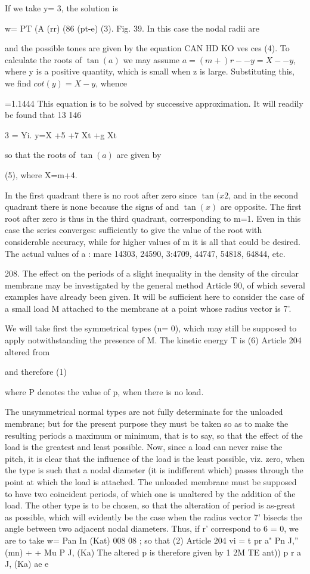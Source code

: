 If we take y= 3, the solution is

w= PT (A (rr) (86 (pt-e) (3). Fig. 39. In this case the nodal
radii are

and the possible tones are given by the equation CAN HD KO ves ces (4).
To calculate the roots of
\( \tan(a)\) we may assume \(a=(m+)r--y=X--y\), where y
is a positive quantity, which is small when z is large. Substituting
this, we find \( cot(y)= X-y\), whence

=1.1444 This equation is to be solved by successive approximation. It
will readily be found that 13 146

3 = Yi. y=X +5 +7 Xt +g Xt


so that the roots of \(\tan(a)\) are given by

(5), where X=m+4.

In the first quadrant there is no root after zero since \(\tan(x 2\), and in
the second quadrant there is none because the signs of and \(\tan(x)\) are
opposite. The first root after zero is thus in the third quadrant,
corresponding to m=1. Even in this case the series converges:
sufficiently to give the value of the root with considerable accuracy,
while for higher values of m it is all that could be desired. The actual
values of a : mare 14303, 24590, 3:4709, 44747, 54818, 64844, etc.

208. The effect on the periods of a slight inequality in the density of
the circular membrane may be investigated by the general method
Article 90, of which several examples have already been given. It will
be sufficient here to consider the case of a small load M attached to
the membrane at a point whose radius vector is 7'.

We will take first the symmetrical types (n= 0), which may still be
supposed to apply notwithstanding the presence of M. The kinetic energy
T is (6) Article 204 altered from

and therefore (1)

where P denotes the value of p, when there is no load.

The unsymmetrical normal types are not fully determinate for the
unloaded membrane; but for the present purpose they must be taken so as
to make the resulting periods a maximum or minimum, that is to say, so
that the effect of the load is the greatest and least possible. Now,
since a load can never raise the pitch, it is clear that the influence
of the load is the least possible, viz. zero, when the type is such that
a nodal diameter (it is indifferent which) passes through the point at
which the load is attached. The unloaded membrane must be supposed to
have two coincident periods, of which one is unaltered by the addition of the
load. The other type is to be chosen, so that the alteration of period
is as-great as possible, which will evidently be the case when the
radius vector 7' bisects the angle between two adjacent nodal diameters.
Thus, if r' correspond to 6 = 0, we are to take w= Pan In (Kat) 008 08 ;
so that (2) Article 204 vi = t pr a" Pn J,'' (mn) + + Mu P J, (Ka) The
altered p is therefore given by 1 2M TE ant)) p r a J, (Ka) ae e

